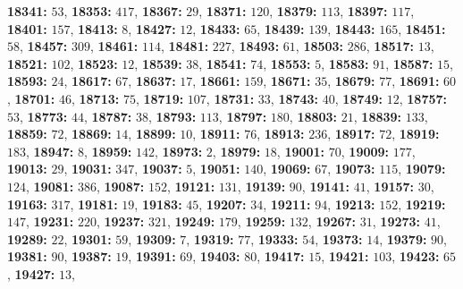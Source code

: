 \textsf{\bfseries 18341:} $53$, \textsf{\bfseries 18353:} $417$, \textsf{\bfseries 18367:} $29$, \textsf{\bfseries 18371:} $120$, \textsf{\bfseries 18379:} $113$, \textsf{\bfseries 18397:} $117$, \textsf{\bfseries 18401:} $157$, \textsf{\bfseries 18413:} $8$, \textsf{\bfseries 18427:} $12$, \textsf{\bfseries 18433:} $65$, \textsf{\bfseries 18439:} $139$, \textsf{\bfseries 18443:} $165$, \textsf{\bfseries 18451:} $58$, \textsf{\bfseries 18457:} $309$, \textsf{\bfseries 18461:} $114$, \textsf{\bfseries 18481:} $227$, \textsf{\bfseries 18493:} $61$, \textsf{\bfseries 18503:} $286$, \textsf{\bfseries 18517:} $13$, \textsf{\bfseries 18521:} $102$, \textsf{\bfseries 18523:} $12$, \textsf{\bfseries 18539:} $38$, \textsf{\bfseries 18541:} $74$, \textsf{\bfseries 18553:} $5$, \textsf{\bfseries 18583:} $91$, \textsf{\bfseries 18587:} $15$, \textsf{\bfseries 18593:} $24$, \textsf{\bfseries 18617:} $67$, \textsf{\bfseries 18637:} $17$, \textsf{\bfseries 18661:} $159$, \textsf{\bfseries 18671:} $35$, \textsf{\bfseries 18679:} $77$, \textsf{\bfseries 18691:} $60$, \textsf{\bfseries 18701:} $46$, \textsf{\bfseries 18713:} $75$, \textsf{\bfseries 18719:} $107$, \textsf{\bfseries 18731:} $33$, \textsf{\bfseries 18743:} $40$, \textsf{\bfseries 18749:} $12$, \textsf{\bfseries 18757:} $53$, \textsf{\bfseries 18773:} $44$, \textsf{\bfseries 18787:} $38$, \textsf{\bfseries 18793:} $113$, \textsf{\bfseries 18797:} $180$, \textsf{\bfseries 18803:} $21$, \textsf{\bfseries 18839:} $133$, \textsf{\bfseries 18859:} $72$, \textsf{\bfseries 18869:} $14$, \textsf{\bfseries 18899:} $10$, \textsf{\bfseries 18911:} $76$, \textsf{\bfseries 18913:} $236$, \textsf{\bfseries 18917:} $72$, \textsf{\bfseries 18919:} $183$, \textsf{\bfseries 18947:} $8$, \textsf{\bfseries 18959:} $142$, \textsf{\bfseries 18973:} $2$, \textsf{\bfseries 18979:} $18$, \textsf{\bfseries 19001:} $70$, \textsf{\bfseries 19009:} $177$, \textsf{\bfseries 19013:} $29$, \textsf{\bfseries 19031:} $347$, \textsf{\bfseries 19037:} $5$, \textsf{\bfseries 19051:} $140$, \textsf{\bfseries 19069:} $67$, \textsf{\bfseries 19073:} $115$, \textsf{\bfseries 19079:} $124$, \textsf{\bfseries 19081:} $386$, \textsf{\bfseries 19087:} $152$, \textsf{\bfseries 19121:} $131$, \textsf{\bfseries 19139:} $90$, \textsf{\bfseries 19141:} $41$, \textsf{\bfseries 19157:} $30$, \textsf{\bfseries 19163:} $317$, \textsf{\bfseries 19181:} $19$, \textsf{\bfseries 19183:} $45$, \textsf{\bfseries 19207:} $34$, \textsf{\bfseries 19211:} $94$, \textsf{\bfseries 19213:} $152$, \textsf{\bfseries 19219:} $147$, \textsf{\bfseries 19231:} $220$, \textsf{\bfseries 19237:} $321$, \textsf{\bfseries 19249:} $179$, \textsf{\bfseries 19259:} $132$, \textsf{\bfseries 19267:} $31$, \textsf{\bfseries 19273:} $41$, \textsf{\bfseries 19289:} $22$, \textsf{\bfseries 19301:} $59$, \textsf{\bfseries 19309:} $7$, \textsf{\bfseries 19319:} $77$, \textsf{\bfseries 19333:} $54$, \textsf{\bfseries 19373:} $14$, \textsf{\bfseries 19379:} $90$, \textsf{\bfseries 19381:} $90$, \textsf{\bfseries 19387:} $19$, \textsf{\bfseries 19391:} $69$, \textsf{\bfseries 19403:} $80$, \textsf{\bfseries 19417:} $15$, \textsf{\bfseries 19421:} $103$, \textsf{\bfseries 19423:} $65$, \textsf{\bfseries 19427:} $13$, 
